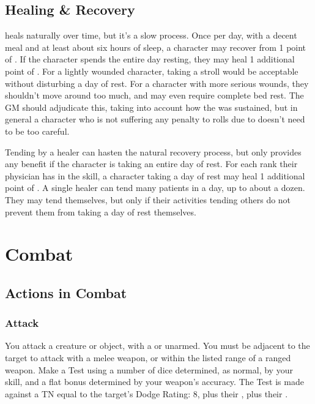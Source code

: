 \subsection{Healing \& Recovery}

 heals naturally over time, but it's a slow process.
Once per day, with a decent meal and at least about six hours of sleep, a character may recover from 1 point of .
If the character spends the entire day resting, they may heal 1 additional point of .
For a lightly wounded character, taking a stroll would be acceptable without disturbing a day of rest.
For a character with more serious wounds, they shouldn't move around too much, and may even require complete bed rest.
The GM should adjudicate this, taking into account how the  was sustained, but in general a character who is not suffering any penalty to rolls due to  doesn't need to be too careful.

Tending by a healer can hasten the natural recovery process, but only provides any benefit if the character is taking an entire day of rest.
For each rank their physician has in the  skill, a character taking a day of rest may heal 1 additional point of .
A single healer can tend many patients in a day, up to about a dozen.
They may tend themselves, but only if their activities tending others do not prevent them from taking a day of rest themselves.

\section{Combat}

\subsection{Actions in Combat}

\subsubsection{Attack}

You attack a creature or object, with a  or unarmed.
You must be adjacent to the target to attack with a melee weapon, or within the listed range of a ranged weapon.
Make a Test using a number of dice determined, as normal, by your  skill, and a flat bonus determined by your weapon's accuracy.
The Test is made against a TN equal to the target's Dodge Rating: 8, plus their , plus their .

